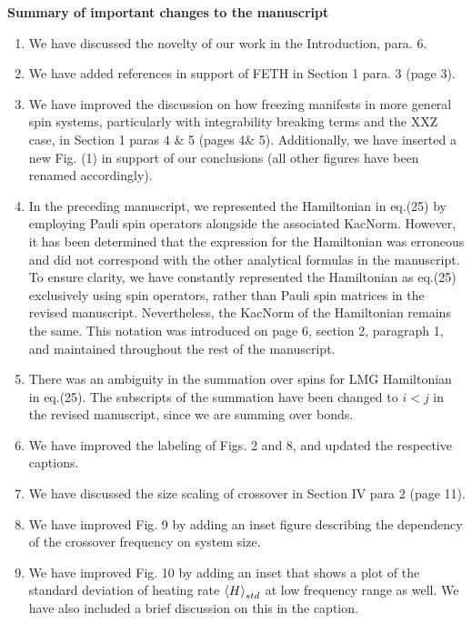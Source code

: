 \documentclass[aps,prb,reprint,showpacs,floatfix,superscriptaddress, onecolumn, nofootinbib, 9pt]{revtex4-2}
\begin{document}
	\vskip 1cm 
	\noindent \textbf{Summary of important changes to the  manuscript}
	\begin{enumerate}
		\item We have discussed the novelty of our work in the Introduction, para. 6.
		\item We have added references in support of FETH in Section 1 para. 3 (page 3).
		\item We have improved the discussion on how freezing manifests in more general spin systems, particularly with integrability breaking terms and the XXZ case, in Section 1 paras 4 \& 5 (pages 4\& 5). Additionally, we have inserted a new Fig. (1) in support of our conclusions (all other figures have been renamed accordingly).
		\item In the preceding manuscript, we represented the Hamiltonian in eq.(25) by employing Pauli spin operators alongside the associated KacNorm. However, it has been determined that the expression for the Hamiltonian was erroneous and did not correspond with the other analytical formulas in the manuscript. To ensure clarity, we have constantly represented the Hamiltonian as eq.(25) exclusively using spin operators, rather than Pauli spin matrices in the revised manuscript. Nevertheless, the KacNorm of the Hamiltonian remains the same. This notation was introduced on page 6, section 2, paragraph 1, and maintained throughout the rest of the manuscript. 
		\item There was an ambiguity in the summation over spins for LMG Hamiltonian in eq.(25). The subscripts of the summation have been changed to $i<j$ in the revised manuscript, since we are summing over bonds.
		\item We have improved the labeling of Figs. 2 and 8, and updated the respective captions.
		\item We have discussed the size scaling of crossover in Section IV para 2 (page 11).
		\item We have improved Fig. 9 by adding an inset figure describing the dependency of the crossover frequency on system size.
		\item We have improved Fig. 10 by adding an inset that shows a plot of the standard deviation of heating rate $\expval{H}_{std}$ at low frequency range as well. We have also included a brief discussion on this in the caption.
	\end{enumerate}
	
	
	
	
\end{document}
